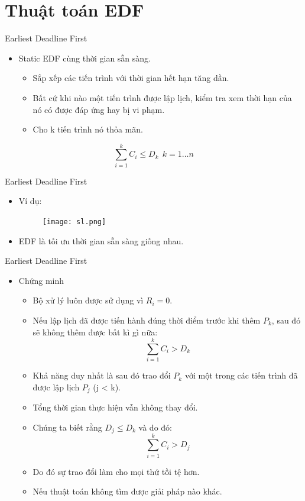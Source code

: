 \documentclass{beamer}
\newcommand{\bi}{\begin{itemize}}
\newcommand{\ei}{\end{itemize}}
\begin{document}
\section{Thuật toán EDF}
\begin{frame}{Earliest Deadline First}
\begin{itemize}
\item Static EDF cùng thời gian sẵn sàng.
\bi
\item Sắp xếp các tiến trình với thời gian hết hạn tăng dần.
\item Bất cứ khi nào một tiến trình được lập lịch, kiểm tra xem thời hạn của nó có được đáp ứng hay bị vi phạm.
\item Cho k tiến trình nó thỏa mãn.
\ei
\end{itemize}
\begin{displaymath}
\sum_{i=1}^k C_i \leq D_k  \ \ k = 1 \ldots n
\end{displaymath}
\end{frame}
\begin{frame}{Earliest Deadline First}
\begin{itemize}
\item Ví dụ:
\begin{figure}[h]
\begin{center}
\texttt{[image: sl.png]}
\end{center}
\end{figure}
\item EDF là tối ưu thời gian sẵn sàng giống nhau.
\end{itemize}
\end{frame}
\begin{frame}{Earliest Deadline First}
\bi
\item Chứng minh
\bi
\item Bộ xử lý luôn được sử dụng vì $R_i = 0$.
\item Nếu lập lịch đã được tiến hành đúng thời điểm trước khi thêm $P_k$, sau đó sẽ không thêm được bất kì gì nữa:
\begin{displaymath}
\sum_{i=1}^{k} C_i > D_k
\end{displaymath}
\item Khả năng duy nhất là sau đó trao đổi $P_k$ với một trong các tiến trình đã được lập lịch $P_j$ (j < k).
\item Tổng thời gian thực hiện vẫn không thay đổi.
\item  Chúng ta biết rằng $D_j \leq D_k$ và do đó:
\begin{displaymath}
\sum_{i=1}^{k} C_i > D_j
\end{displaymath}
\item Do đó sự trao đổi làm cho mọi thứ tồi tệ hơn.
\item Nếu thuật toán không tìm được giải pháp nào khác.
\ei
\ei
\end{frame}
\end{document}
